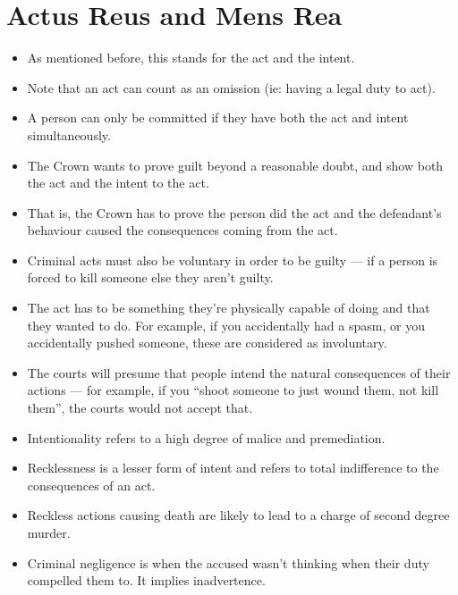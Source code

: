 \documentclass{article}
\begin{document}
\section{Actus Reus and Mens Rea}
\begin{itemize}
    \item As mentioned before, this stands for the act and the intent.
    \item Note that an act can count as an omission (ie: having a legal duty to act).
    \item A person can only be committed if they have both the act and intent simultaneously.
    \item The Crown wants to prove guilt beyond a reasonable doubt, and show both the act and the intent to the act.
    \item That is, the Crown has to prove the person did the act and the defendant's behaviour caused the consequences coming from the act.
    \item Criminal acts must also be voluntary in order to be guilty --- if a person is forced to kill someone else they aren't guilty.
    \item The act has to be something they're physically capable of doing and that they wanted to do.  For example, if you accidentally had a spasm, or you accidentally pushed someone, these are considered as involuntary.
    \item The courts will presume that people intend the natural consequences of their actions --- for example, if you ``shoot someone to just wound them, not kill them'', the courts would not accept that.
    \item Intentionality refers to a high degree of malice and premediation.
    \item Recklessness is a lesser form of intent and refers to total indifference to the consequences of an act.
    \item Reckless actions causing death are likely to lead to a charge of second degree murder.
    \item Criminal negligence is when the accused wasn't thinking when their duty compelled them to.  It implies inadvertence.
\end{itemize}
\end{document}

